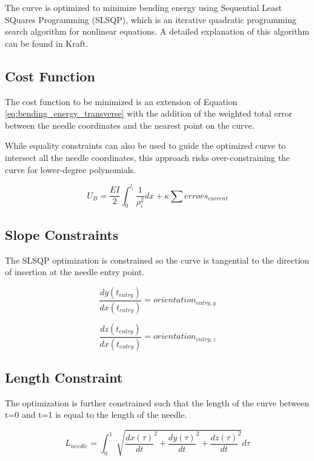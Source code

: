 The curve is optimized to minimize bending energy using Sequential Least SQuares Programming (SLSQP), which is an iterative quadratic programming search algorithm for nonlinear equations. A detailed explanation of this algorithm can be found in Kraft.

\subsection{Cost Function}
The cost function to be minimized is an extension of Equation \ref{eq:bending_energy_transverse} with the addition of the weighted total error between the needle coordinates and the nearest point on the curve. 

While equality constraints can also be used to guide the optimized curve to intersect all the needle coordinates, this approach risks over-constraining the curve for lower-degree polynomials.

\begin{equation}
\label{eq:cost_function}
U_B = \frac{EI}{2}\int_{0}^{l_i}\frac{1}{\rho^2_i}dx + \kappa\sum errors_{current}
\end{equation}

\subsection{Slope Constraints}
The SLSQP optimization is constrained so the curve is tangential to the direction of insertion at the needle entry point.

\begin{equation}
\label{eq:slope_constraint_y}
\frac{dy(t_{entry})}{dx(t_{entry})} = orientation_{entry,y}
\end{equation}

\begin{equation}
\label{eq:slope_constraint_z}
\frac{dz(t_{entry})}{dx(t_{entry})} = orientation_{entry,z}
\end{equation}

\subsection{Length Constraint}
The optimization is further constrained such that the length of the curve between t=0 and t=1 is equal to the length of the needle.

\begin{equation}
\label{eq:length_constraint}
L_{needle} = \int_0^1 \sqrt[]{\frac{dx(\tau)}{dt}^2 + \frac{dy(\tau)}{dt}^2 + \frac{dz(\tau)}{dt}^2} d\tau
\end{equation}


